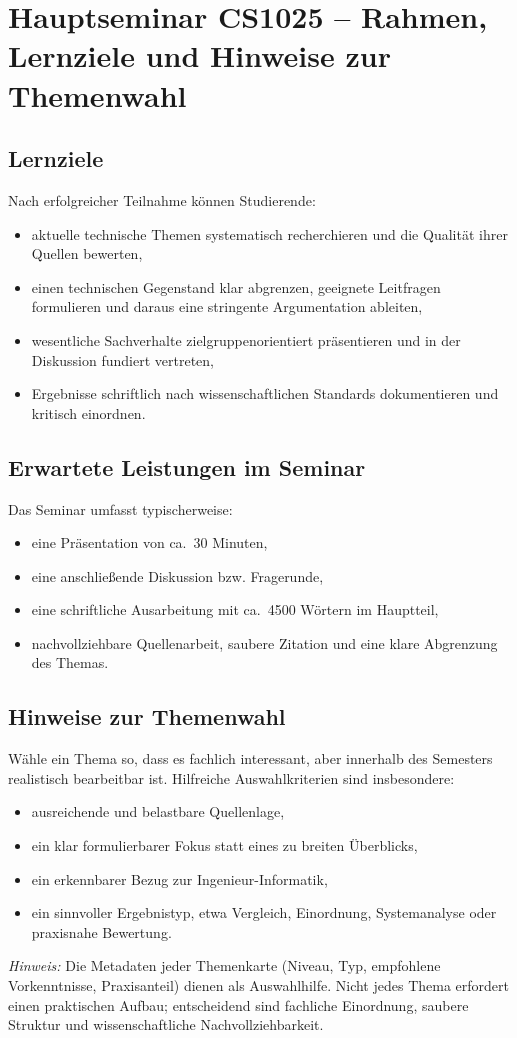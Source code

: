 \section*{Hauptseminar CS1025 -- Rahmen, Lernziele und Hinweise zur Themenwahl}
\subsection*{Lernziele}
Nach erfolgreicher Teilnahme können Studierende:
\begin{itemize}
  \item aktuelle technische Themen systematisch recherchieren und die Qualität ihrer Quellen bewerten,
  \item einen technischen Gegenstand klar abgrenzen, geeignete Leitfragen formulieren und daraus eine stringente Argumentation ableiten,
  \item wesentliche Sachverhalte zielgruppenorientiert präsentieren und in der Diskussion fundiert vertreten,
  \item Ergebnisse schriftlich nach wissenschaftlichen Standards dokumentieren und kritisch einordnen.
\end{itemize}

\subsection*{Erwartete Leistungen im Seminar}
Das Seminar umfasst typischerweise:
\begin{itemize}
  \item eine Präsentation von ca.\ 30 Minuten,
  \item eine anschließende Diskussion bzw. Fragerunde,
  \item eine schriftliche Ausarbeitung mit ca.\ 4500 Wörtern im Hauptteil,
  \item nachvollziehbare Quellenarbeit, saubere Zitation und eine klare Abgrenzung des Themas.
\end{itemize}

\subsection*{Hinweise zur Themenwahl}
Wähle ein Thema so, dass es fachlich interessant, aber innerhalb des Semesters realistisch bearbeitbar ist.
Hilfreiche Auswahlkriterien sind insbesondere:
\begin{itemize}
  \item ausreichende und belastbare Quellenlage,
  \item ein klar formulierbarer Fokus statt eines zu breiten Überblicks,
  \item ein erkennbarer Bezug zur Ingenieur-Informatik,
  \item ein sinnvoller Ergebnistyp, etwa Vergleich, Einordnung, Systemanalyse oder praxisnahe Bewertung.
\end{itemize}

\noindent\textit{Hinweis:} Die Metadaten jeder Themenkarte (Niveau, Typ, empfohlene Vorkenntnisse, Praxisanteil) dienen als Auswahlhilfe. Nicht jedes Thema erfordert einen praktischen Aufbau; entscheidend sind fachliche Einordnung, saubere Struktur und wissenschaftliche Nachvollziehbarkeit.
